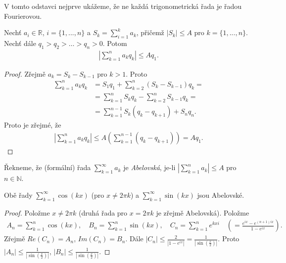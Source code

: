 V tomto odstavci nejprve ukážeme, že ne každá trigonometrická řada je řadou Fourierovou.

\begin{lemma}[Abel]\label{l_4.18_Abel}
Nechť $a_i \in \mathbb{R}$, $i = \{1,..., n\}$ a $S_k = \sum \limits _{i=1}^k a_k$, přičemž $|S_k| \leq A$ pro $k = \{1,..., n\}$. Nechť dále $q_1 > q_2 > \ldots > q_n > 0$. Potom
\begin{align*}
\left| \sum \limits _{k=1}^n a_k q_k \right| \leq A q_1.
\end{align*}
\begin{proof}
Zřejmě $a_k = S_k - S_{k-1}$ pro $k > 1$. Proto
\begin{align*}
\sum \limits _{k=1}^n a_k q_k &= S_1 q_1 + \sum \limits _{k=2}^n (S_k - S_{k-1}) q_k =\\
&= \sum \limits _{k=1}^n S_k q_k - \sum \limits _{k=2}^n S_{k-1} q_k =\\
&=  \sum \limits _{k=1}^{n-1} S_k (q_k - q_{k+1}) + S_n q_n.
\end{align*}
Proto je zřejmé, že
\begin{align*}
\left| \sum \limits _{k=1}^n a_k q_k \right| \leq A \left( \sum \limits _{k=1}^{n-1} (q_k - q_{k+1}) \right) = A q_1.
\end{align*}
\end{proof}
\end{lemma}

\begin{definition}
\label{d_4.19}
Řekneme, že (formální) řada $\sum \limits _{k=1}^{\infty} a_k$ je \textit{Abelovská}, je-li $| \sum \limits _{k=1}^n a_k | \leq A$ pro $n \in \mathbb{N}$.
\end{definition}

\begin{lemma}\label{l_4.20}
Obě řady $\sum \limits _{k=1}^{\infty} \cos (kx)$ (pro $x \neq 2 \pi k$) a $\sum \limits _{k=1}^{\infty} \sin (kx)$ jsou Abelovské.
\end{lemma}
\begin{proof}
Položme $ x \neq 2 \pi k$ (druhá řada pro $x = 2 \pi k$ je zřejmě Abelovská). Položme
\begin{align*}
A_n = \sum \limits _{k=1}^n \cos (kx), \quad B_n = \sum \limits _{k=1}^n \sin (kx), \quad C_n = \sum \limits _{k=1}^n e^{k x i} \quad \left( = \frac{e^{ix}-e^{(n+1)ix}}{1 - e^{ix}} \right).
\end{align*}
Zřejmě $Re(C_n) = A_n$, $Im(C_n) = B_n$. Dále $|C_n| \leq \frac{2}{|1-e^{ix}|} = \frac{1}{|\sin (\frac{x}{2})|}$. Proto $|A_n| \leq \frac{1}{| \sin (\frac{x}{2})|} $, $|B_n| \leq \frac{1}{| \sin (\frac{x}{2})|}$.
\end{proof}


